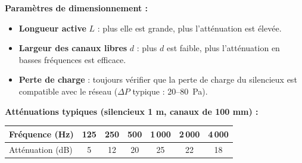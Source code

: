 \textbf{Paramètres de dimensionnement :}
\begin{itemize}
  \item \textbf{Longueur active} $L$ : plus elle est grande, plus l'atténuation est élevée.
  \item \textbf{Largeur des canaux libres} $d$ : plus $d$ est faible, plus l'atténuation en basses fréquences est efficace.
  \item \textbf{Perte de charge} : toujours vérifier que la perte de charge du silencieux est compatible avec le réseau ($\Delta P$ typique : 20--80~Pa).
\end{itemize}

\textbf{Atténuations typiques (silencieux 1 m, canaux de 100 mm) :}

\begin{center}
\begin{tabular}{lcccccc}
\toprule
Fréquence (Hz) & 125 & 250 & 500 & 1\,000 & 2\,000 & 4\,000 \\
\midrule
Atténuation (dB) & 5 & 12 & 20 & 25 & 22 & 18 \\
\bottomrule
\end{tabular}
\end{center}

